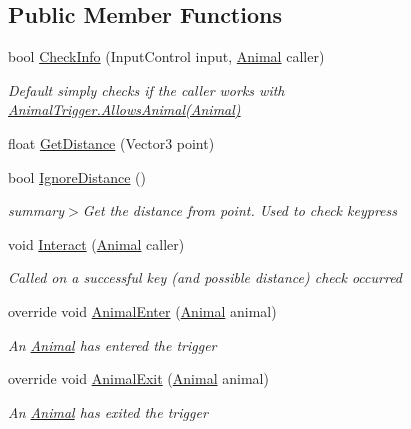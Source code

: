 \subsection*{Public Member Functions}
\begin{DoxyCompactItemize}
\item 
bool \mbox{\hyperlink{class_animal_interactor_a12da79f6eb050c54043ff783e7c2a725}{Check\+Info}} (Input\+Control input, \mbox{\hyperlink{class_animal}{Animal}} caller)
\begin{DoxyCompactList}\small\item\em Default simply checks if the {\itshape caller}  works with \mbox{\hyperlink{class_animal_trigger_ae8394dfcf5f91b8c413959a4d6baa3a9}{Animal\+Trigger.\+Allows\+Animal(\+Animal)}} \end{DoxyCompactList}\item 
float \mbox{\hyperlink{class_animal_interactor_a92693dc7d95858e69c2f787507f14acb}{Get\+Distance}} (Vector3 point)
\item 
bool \mbox{\hyperlink{class_animal_interactor_a51de9b553e86019f8d45d10915fe960c}{Ignore\+Distance}} ()
\begin{DoxyCompactList}\small\item\em summary$>$Get the distance from point. Used to check keypress\end{DoxyCompactList}\item 
void \mbox{\hyperlink{class_animal_interactor_ab7aa5df1cd2596715b1edf39752ae02f}{Interact}} (\mbox{\hyperlink{class_animal}{Animal}} caller)
\begin{DoxyCompactList}\small\item\em Called on a successful key (and possible distance) check occurred\end{DoxyCompactList}\item 
override void \mbox{\hyperlink{class_animal_interactor_a91ee9e749597002a9d8b48055f3ee0ce}{Animal\+Enter}} (\mbox{\hyperlink{class_animal}{Animal}} animal)
\begin{DoxyCompactList}\small\item\em An \mbox{\hyperlink{class_animal}{Animal}} has entered the trigger \end{DoxyCompactList}\item 
override void \mbox{\hyperlink{class_animal_interactor_a0ff1e2c10b462d19357913cbf1f2d023}{Animal\+Exit}} (\mbox{\hyperlink{class_animal}{Animal}} animal)
\begin{DoxyCompactList}\small\item\em An \mbox{\hyperlink{class_animal}{Animal}} has exited the trigger \end{DoxyCompactList}\end{DoxyCompactItemize}

